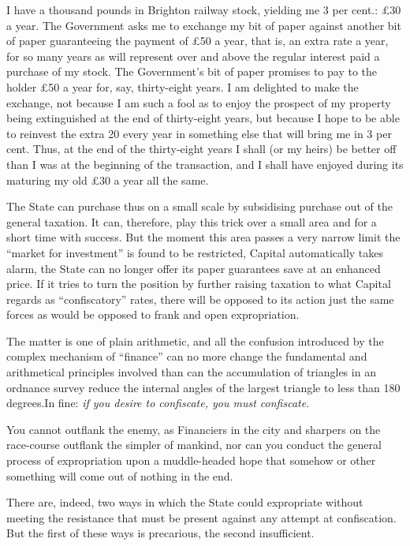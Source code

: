 \documentclass{book}
\begin{document}
I have a thousand pounds in Brighton railway stock, yielding me 3 per cent.: £30 a year. The Government asks me to exchange my bit of paper against another bit of paper guaranteeing the payment of £50 a year, that is, an extra rate a year, for so many years as will represent over and above the regular interest paid a purchase of my stock. The Government’s bit of paper promises to pay to the holder £50 a year for, say, thirty-eight years. I am delighted to make the exchange, not because I am such a fool as to enjoy the prospect of my property being extinguished at the end of thirty-eight years, but because I hope to be able to reinvest the extra 20 every year in something else that will bring me in 3 per cent. Thus, at the end of the thirty-eight years I shall (or my heirs) be better off than I was at the beginning of the transaction, and I shall have enjoyed during its maturing my old £30 a year all the same.

The State can purchase thus on a small scale by subsidising purchase out of the general taxation. It can, therefore, play this trick over a small area and for a short time with success. But the moment this area passes a very narrow limit the “market for investment” is found to be restricted, Capital automatically takes alarm, the State can no longer offer its paper guarantees save at an enhanced price. If it tries to turn the position by further raising taxation to what Capital regards as “confiscatory” rates, there will be opposed to its action just the same forces as would be opposed to frank and open expropriation.

The matter is one of plain arithmetic, and all the confusion introduced by the complex mechanism of “finance” can no more change the fundamental and arithmetical principles involved than can the accumulation of triangles in an ordnance survey reduce the internal angles of the largest triangle to less than 180 degrees.\footnotemark[3] In fine: \emph{if you desire to confiscate, you must confiscate.}

You cannot outflank the enemy, as Financiers in the city and sharpers on the race-course outflank the simpler of mankind, nor can you conduct the general process of expropriation upon a muddle-headed hope that somehow or other something will come out of nothing in the end.

There are, indeed, two ways in which the State could expropriate without meeting the resistance that must be present against any attempt at confiscation. But the first of these ways is precarious, the second insufficient.
\end{document}
